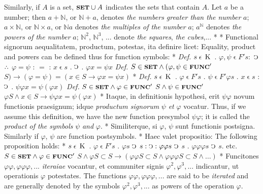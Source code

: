 \documentclass{book}
\newcommand{\C}{\mathop{\sbox0{$\displaystyle$$\reflectbox{C}$} %
\raisebox{-\height+\ht0-0.05cm}[\ht0][\dp0]{\scalebox{0.8}[0.8]{\copy0}}}\displaylimits} %
\newcommand{\pppNoSpace}{\leavevmode\lower0ex\hbox{.}\kern-0.1em\raise0.7ex\hbox{.}\kern-0.1em\lower0ex\hbox{.}} %
\newcommand{\smallIn}{\ensuremath{\mathrel{\epsilon}}}
\newcommand{\K}{\mathop{\thinspace \text{K} \thinspace}}
\newcommand{\setOfSets}{\mathord{\text{{\footnotesize \textbf{SET}}}}}
\newcommand{\func}{\mathord{\text{{\footnotesize \textbf{FUNC}}}}}
\newenvironment{translateTwoCol}
               { %
                 \columnratio{0.5, 0.5} \begin{paracol}{2}
                 \newcommand{\LAT}{\switchcolumn[0]*}
                 \newcommand{\ENG}{\switchcolumn[1]}
               }
               { %
                 \let\ENG\undefined
                 \let\LAT\undefined
                 \end{paracol}
               }
\begin{document}
\begin{translateTwoCol}
\ENG
Similarly, if $A$ is a set, $\setOfSets \cup A$ indicates the sets that contain $A$. Let $a$ be a number; then $a + \mathbb{N}$, or $\mathbb{N} + a$, denotes \emph{the numbers greater than the number} $a$; $a \times \mathbb{N}$, or $\mathbb{N} \times a$, or $\mathbb{N} a$ denotes \emph{the multiples of the number} $a$; $a^\mathbb{N}$ denotes \emph{the powers of the number} $a$; $\mathbb{N}^2$, $\mathbb{N}^3$, ... denote \emph{the squares}, \emph{the cubes},...
\LAT
\hfill
\ENG
\hfill
\LAT
Functional signorum aequalitatem, productum, potestas, ita definire licet:
\ENG
Equality, product and powers can be defined thus for function symbols:
\LAT
\emph{Def.} \hspace{0.25cm} $s \smallIn \K$ . $\varphi, \psi \smallIn F' s :$ $\C$ $\pppNoSpace$ $\varphi = \psi$ : $=$ : $x \smallIn s$ . $\C$ . $\varphi x = \psi x$
\ENG
\emph{Def.} \hspace{0.25cm} $S \in \setOfSets \wedge (\varphi, \psi \in \func'$ $S) \rightarrow (\varphi = \psi) = (x \in S \rightarrow \varphi x = \psi x)$
\LAT
\emph{Def.} \hspace{0.25cm} $s \smallIn \K$ . $\varphi \smallIn F' s$ $.$ $\psi \smallIn F' \varphi s$ . $x \smallIn s$ : $\C$ . $\psi \varphi x = \psi (\varphi x)$
\ENG
\emph{Def.} \hspace{0.25cm} $S \in \setOfSets \wedge \varphi \in \func'$ $S \wedge \psi \in \func'$ $\varphi S \wedge x \in S \rightarrow \psi \varphi x = \psi (\varphi x)$
\LAT
Itaque, in definitionis hypothesi, erit $\psi \varphi$ novum functionis praesignum; idque \emph{productum signorum} $\psi$ \emph{et} $\varphi$ vocatur.
\ENG
Thus, if we assume this definition, we have the new function presymbol $\psi \varphi$; it is called the \emph{product of the symbols} $\psi$ \emph{and} $\varphi$.
\LAT
Similiterque, si $\varphi$, $\psi$ sunt functionis postsigna.
\ENG
Similarly if $\varphi$, $\psi$ are function postsymbols.
\LAT
Haec valet propositio:
\ENG
The following proposition holds:
\LAT
\hspace{1.06cm} $s \smallIn \K$ . $\varphi \smallIn F' s$ . $\varphi s$ $\C$ $s : \C : \varphi \varphi s$ $\C$ $s$ . $\varphi \varphi \varphi s$ $\C$ $s$. etc.
\ENG
\hspace{1.06cm} $S \in \setOfSets \wedge \varphi\in \func'$ $S \wedge \varphi S \subset S \rightarrow (\varphi \varphi S \subset S \wedge \varphi \varphi \varphi S \subset S \wedge \ldots)$ 
\LAT
Funcitones $\varphi \varphi, \varphi \varphi \varphi,...$ \emph{iteraiae} vocantur, et communiter signis $\varphi^2, \varphi^3,...$ indicantur, ut operationis $\varphi$ potestates.
\ENG
The functions $\varphi \varphi, \varphi \varphi \varphi,...$ are said to be \emph{iterated} and are generally denoted by the symbols $\varphi^2, \varphi^3,...$ as powers of the operation $\varphi$.
\end{translateTwoCol}
\end{document}

